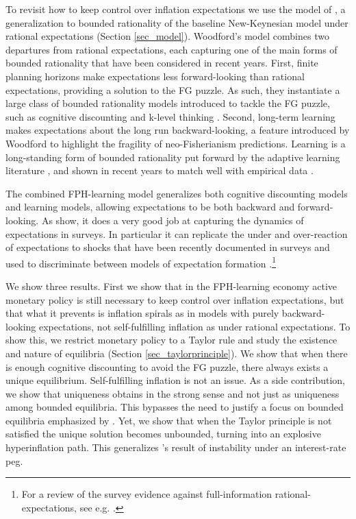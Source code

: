 \documentclass{article}
\begin{document}
To revisit how to keep control over inflation expectations we use the model of \cite{Woodford2019}, a generalization to bounded rationality of the baseline New-Keynesian model under rational expectations (Section \ref{sec_model}). Woodford's model combines two departures from rational expectations, each capturing one of the main forms of bounded rationality that have been considered in recent years. First, finite planning horizons make expectations less forward-looking than rational expectations, providing a solution to the FG puzzle. As such, they instantiate a large class of bounded rationality models introduced to tackle the FG puzzle, such as cognitive discounting \citep{Gabaix2020} and k-level thinking \citep{FarhiWerning2019}. Second, long-term learning makes expectations about the long run backward-looking, a feature introduced by Woodford to highlight the fragility of neo-Fisherianism predictions. Learning is a long-standing form of bounded rationality put forward by the adaptive learning literature \citep[][]{EvansHonkapohjaBook}, and shown in recent years to match well with empirical data \citep{EusepiPreston_shorthistory} .

The combined FPH-learning model generalizes both cognitive discounting models and learning models, allowing expectations to be both backward and forward-looking. As \cite{Gustetal2024} show, it does a very good job at capturing the dynamics of expectations in surveys. In particular it can replicate the under and over-reaction of expectations to shocks that have been recently documented in surveys and used to discriminate between models of expectation formation \citep{CG2015,KW2021,AHS2020}.\footnote{For a review of the survey evidence against full-information rational-expectations, see e.g. \cite{BornEndersMuller_literaturereview}.}

We show three results. First we show that in the FPH-learning economy active monetary policy is still necessary to keep control over inflation expectations, but that what it prevents is inflation spirals as in models with purely backward-looking expectations, not self-fulfilling inflation as under rational expectations. To show this, we restrict monetary policy to a Taylor rule and study the existence and nature of equilibria (Section \ref{sec_taylorprinciple}). We show that when there is enough cognitive discounting to avoid the FG puzzle, there always exists a unique equilibrium. Self-fulfilling inflation is not an issue. As a side contribution, we show that uniqueness obtains in the strong sense and not just as uniqueness among bounded equilibria. This bypasses the need to justify a focus on bounded equilibria emphasized by \citep{Cochrane2011}. Yet, we show that when the Taylor principle is not satisfied the unique solution becomes unbounded, turning into an explosive hyperinflation path. This generalizes \cite{Woodford2019}'s result of instability under an interest-rate peg.
\end{document}
